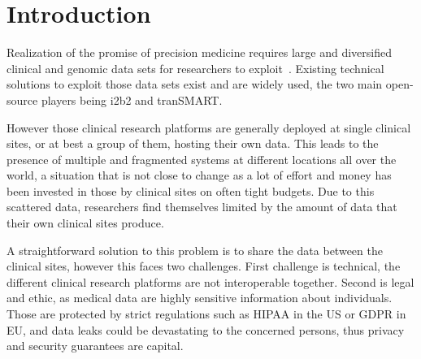 

\chapter{Introduction}

Realization of the promise of precision medicine requires large and diversified clinical and genomic data sets for researchers to exploit~\cite{todo1}.
Existing technical solutions to exploit those data sets exist and are widely used, the two main open-source players being i2b2 and tranSMART.

However those clinical research platforms are generally deployed at single clinical sites, or at best a group of them, hosting their own data.
This leads to the presence of multiple and fragmented systems at different locations all over the world, a situation that is not close to change as a lot of effort and money has been invested in those by clinical sites on often tight budgets.
Due to this scattered data, researchers find themselves limited by the amount of data that their own clinical sites produce.

A straightforward solution to this problem is to share the data between the clinical sites, however this faces two challenges.
First challenge is technical, the different clinical research platforms are not interoperable together.
Second is legal and ethic, as medical data are highly sensitive information about individuals.
Those are protected by strict regulations such as HIPAA in the US or GDPR in EU, and data leaks could be devastating to the concerned persons, thus privacy and security guarantees are capital.

